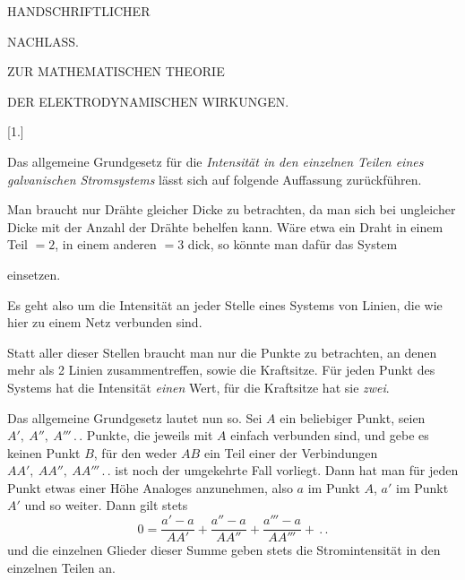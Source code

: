 \clearpage
{}
\thispagestyle{empty}
\vspace*{35mm}
\begin{center}
{\large HANDSCHRIFTLICHER}\par\vspace{20mm}
{\LARGE NACHLASS.}
\end{center}
\clearpage
{}
\begin{center}
{\large ZUR MATHEMATISCHEN THEORIE}\par\vspace{3mm}
{\large DER ELEKTRODYNAMISCHEN WIRKUNGEN.}
\end{center}
\begin{center}[1.]\end{center}
Das allgemeine Grundgesetz für die \textit{Intensität in den einzelnen Teilen eines galvanischen Stromsystems} lässt sich auf folgende Auffassung zurückführen.

Man braucht nur Drähte gleicher Dicke zu betrachten, da man sich bei ungleicher Dicke mit der Anzahl der Drähte behelfen kann. Wäre etwa ein Draht in einem Teil $=2$, in einem anderen $=3$ dick, so könnte man dafür das System
\begin{center}\resizebox{.62\linewidth}{!}{}\end{center}
einsetzen.

Es geht also um die Intensität an jeder Stelle eines Systems von Linien, die wie hier zu einem Netz verbunden sind.
\begin{center}\resizebox{.63\linewidth}{!}{}\end{center}
Statt aller dieser Stellen braucht man nur die Punkte zu betrachten, an denen mehr als 2 Linien zusammentreffen, sowie die Kraftsitze. Für jeden Punkt des Systems hat die Intensität \textit{einen} Wert, für die Kraftsitze hat sie \textit{zwei}.

Das allgemeine Grundgesetz lautet nun so. Sei $A$ ein beliebiger Punkt, seien $A',\ A'',\ A'''\,.\,.$ Punkte, die jeweils mit $A$ einfach verbunden sind, und gebe es keinen Punkt $B$, für den weder $AB$ ein Teil einer der Verbindungen $AA',\ AA'',\ AA'''\,.\,.$ ist noch der umgekehrte Fall vorliegt. Dann hat man für jeden Punkt etwas einer Höhe Analoges anzunehmen, also $a$ im Punkt $A$, $a'$ im Punkt $A'$ und so weiter. Dann gilt stets
\[
0=\frac{a'-a}{AA'}+\frac{a''-a}{AA''}+\frac{a'''-a}{AA'''}+\,.\,.
\]
und die einzelnen Glieder dieser Summe geben stets die Stromintensität in den einzelnen Teilen an.

